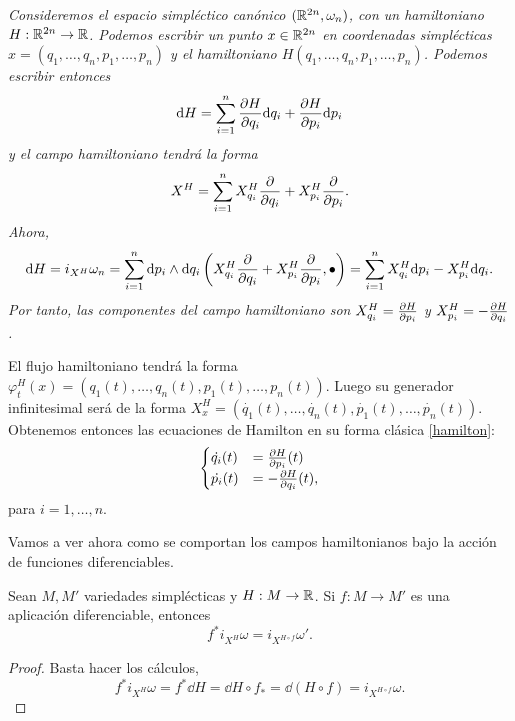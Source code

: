 \begin{ejemplo}
  \em
  Consideremos el espacio simpléctico canónico $(\mathbb{R}^{2n},\omega_n)$, con un hamiltoniano $H:\mathbb{R}^{2n}\rightarrow \mathbb{R}$. Podemos escribir un punto $x\in \mathbb{R}^{2n}$ en coordenadas simplécticas $x = (q_1,\dots,q_n,p_1,\dots,p_n)$ y el hamiltoniano $H(q_1,\dots,q_n,p_1,\dots,p_n)$. Podemos escribir entonces
  \begin{equation*}
    \mathrm{d} H = \sum_{i=1}^n \frac{\partial H}{\partial q_i} \mathrm{d}{q_i} + \frac{\partial H}{\partial p_i} \mathrm{d}{p_i}
  \end{equation*}
  y el campo hamiltoniano tendrá la forma
  \begin{equation*}
    X^H = \sum_{i=1}^n X_{q_i}^H \frac{\partial}{\partial q_i} + X_{p_i}^H \frac{\partial}{\partial p_i}.
  \end{equation*}
  Ahora, 
  \begin{equation*}
    \mathrm{d} H = i_{X^H}\omega_n = \sum_{i=1}^n \mathrm{d} p_i \wedge \mathrm{d} q_i \left(X_{q_i}^H \frac{\partial}{\partial q_i} + X^H_{p_i} \frac{\partial}{\partial p_i},\bullet\right)  = \sum_{i=1}^n X_{q_i}^H \mathrm{d} p_i -X_{p_i}^H \mathrm{d} q_i.
  \end{equation*}
  Por tanto, las componentes del campo hamiltoniano son $X^H_{q_i}=\frac{\partial H}{\partial p_i}$ y $X^H_{p_i}=-\frac{\partial H}{\partial q_i}$.

  El flujo hamiltoniano tendrá la forma $\varphi^H_t(x) = (q_1(t),\dots,q_n(t),p_1(t),\dots,p_n(t))$. Luego su generador infinitesimal será de la forma $X^H_x=(\dot{q_1}(t),\dots,\dot{q_n}(t),\dot{p_1}(t),\dots,\dot{p_n}(t))$. Obtenemos entonces las ecuaciones de Hamilton en su forma clásica \eqref{hamilton}:
  \begin{equation*}
  \begin{cases}
     \dot{q_i}(t) & = \frac{\partial H}{\partial p_i}(t) \\
     \dot{p_i}(t) & = -\frac{\partial H}{\partial q_i} (t),
  \end{cases}
\end{equation*}
  para $i=1,\dots,n$.
\end{ejemplo}

Vamos a ver ahora como se comportan los campos hamiltonianos bajo la acción de funciones diferenciables.

\begin{prop}
 Sean $M,M'$ variedades simplécticas y $H:M\rightarrow \mathbb{R}$. Si $f:M\rightarrow M'$ es una aplicación diferenciable, entonces 
 \begin{equation*}
   f^*i_{X^H}\omega=i_{X^{H\circ f}}\omega'.
 \end{equation*}
\end{prop}
\begin{proof}
  Basta hacer los cálculos,
  \begin{equation*}
    f^*i_{X^H}\omega=f^*\dd H=\dd H \circ f_* = \dd (H\circ f)=i_{X^{H\circ f}}\omega.
  \end{equation*}
\end{proof}

